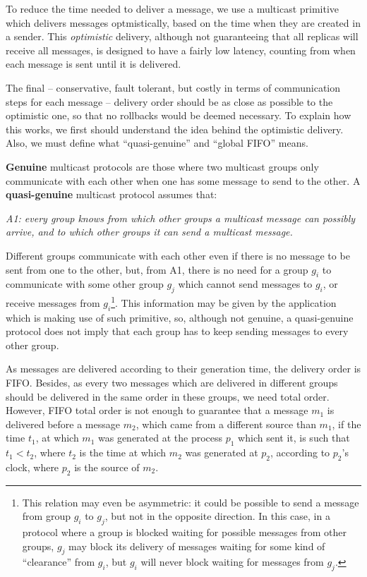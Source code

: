\documentclass[times, 10pt]{article}
\begin{document}
To reduce the time needed to deliver a message, we use a multicast primitive which delivers messages optmistically, based on the time when they are created in a sender. This \emph{optimistic} delivery, although not guaranteeing that all replicas will receive all messages, is designed to have a fairly low latency, counting from when each message is sent until it is delivered.

The final -- conservative, fault tolerant, but costly in terms of communication steps for each message -- delivery order should be as close as possible to the optimistic one, so that no rollbacks would be deemed necessary. To explain how this works, we first should understand the idea behind the optimistic delivery. Also, we must define what ``quasi-genuine'' and ``global FIFO'' means.

\textbf{Genuine} multicast protocols are those where two multicast groups only communicate with each other when one has some message to send to the other. A \textbf{quasi-genuine} multicast protocol assumes that: 

\begin{center}
\emph{A1: every group knows from which other groups a multicast message can possibly arrive, and to which other groups it can send a multicast message.}
\end{center}

Different groups communicate with each other even if there is no message to be sent from one to the other, but, from A1, there is no need for a group $g_i$ to communicate with some other group $g_j$ which cannot send messages to $g_i$, or receive messages from $g_i$\footnote{This relation may even be asymmetric: it could be possible to send a message from group $g_i$ to $g_j$, but not in the opposite direction. In this case, in a protocol where a group is blocked waiting for possible messages from other groups, $g_j$ may block its delivery of messages waiting for some kind of ``clearance'' from $g_i$, but $g_i$ will never block waiting for messages from $g_j$.}. This information may be given by the application which is making use of such primitive, so, although not genuine, a quasi-genuine protocol does not imply that each group has to keep sending messages to every other group.

As messages are delivered according to their generation time, the delivery order is FIFO. Besides, as every two messages which are delivered in different groups should be delivered in the same order in these groups, we need total order. However, FIFO total order is not enough to guarantee that a message $m_1$ is delivered before a message $m_2$, which came from a different source than $m_1$, if the time $t_1$, at which $m_1$ was generated at the process $p_1$ which sent it, is such that $t_1 < t_2$, where $t_2$ is the time at which $m_2$ was generated at $p_2$, according to $p_2$'s clock, where $p_2$ is the source of $m_2$.
\end{document}
